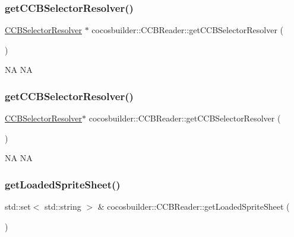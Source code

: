 \subsubsection{\texorpdfstring{get\+C\+C\+B\+Selector\+Resolver()}{getCCBSelectorResolver()}\hspace{0.1cm}{\footnotesize\ttfamily [1/2]}}
{\footnotesize\ttfamily \hyperlink{classcocosbuilder_1_1CCBSelectorResolver}{C\+C\+B\+Selector\+Resolver} $\ast$ cocosbuilder\+::\+C\+C\+B\+Reader\+::get\+C\+C\+B\+Selector\+Resolver (\begin{DoxyParamCaption}{ }\end{DoxyParamCaption})}

NA  NA \mbox{\label{classcocosbuilder_1_1CCBReader_a323ddc1b95bc697512dd6fce70127cc0}} 
\subsubsection{\texorpdfstring{get\+C\+C\+B\+Selector\+Resolver()}{getCCBSelectorResolver()}\hspace{0.1cm}{\footnotesize\ttfamily [2/2]}}
{\footnotesize\ttfamily \hyperlink{classcocosbuilder_1_1CCBSelectorResolver}{C\+C\+B\+Selector\+Resolver}$\ast$ cocosbuilder\+::\+C\+C\+B\+Reader\+::get\+C\+C\+B\+Selector\+Resolver (\begin{DoxyParamCaption}{ }\end{DoxyParamCaption})}

NA  NA \mbox{\label{classcocosbuilder_1_1CCBReader_adf8ae8ca90d8e95c28b327f3077e5535}} 
\subsubsection{\texorpdfstring{get\+Loaded\+Sprite\+Sheet()}{getLoadedSpriteSheet()}\hspace{0.1cm}{\footnotesize\ttfamily [1/2]}}
{\footnotesize\ttfamily std\+::set$<$ std\+::string $>$ \& cocosbuilder\+::\+C\+C\+B\+Reader\+::get\+Loaded\+Sprite\+Sheet (\begin{DoxyParamCaption}{ }\end{DoxyParamCaption})}


